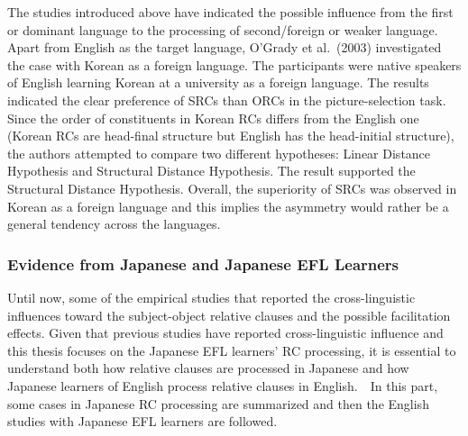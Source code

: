 \documentclass[
]{article}
\begin{document}
The studies introduced above have indicated the possible influence from
the first or dominant language to the processing of second/foreign or
weaker language. Apart from English as the target language, O'Grady et
al.~(2003) investigated the case with Korean as a foreign language. The
participants were native speakers of English learning Korean at a
university as a foreign language. The results indicated the clear
preference of SRCs than ORCs in the picture-selection task. Since the
order of constituents in Korean RCs differs from the English one (Korean
RCs are head-final structure but English has the head-initial
structure), the authors attempted to compare two different hypotheses:
Linear Distance Hypothesis and Structural Distance Hypothesis. The
result supported the Structural Distance Hypothesis. Overall, the
superiority of SRCs was observed in Korean as a foreign language and
this implies the asymmetry would rather be a general tendency across the
languages.

\subsubsection{Evidence from Japanese and Japanese EFL
Learners}\label{evidence-from-japanese-and-japanese-efl-learners}

Until now, some of the empirical studies that reported the
cross-linguistic influences toward the subject-object relative clauses
and the possible facilitation effects. Given that previous studies have
reported cross-linguistic influence and this thesis focuses on the
Japanese EFL learners' RC processing, it is essential to understand both
how relative clauses are processed in Japanese and how Japanese learners
of English process relative clauses in English.　In this part, some
cases in Japanese RC processing are summarized and then the English
studies with Japanese EFL learners are followed.
\end{document}
